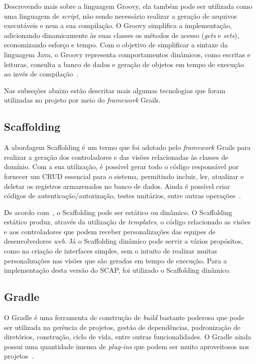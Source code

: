 Descrevendo mais sobre a linguagem Groovy, ela também pode ser utilizada como uma linguagem de \textit{script}, não sendo necessário realizar a geração de arquivos executáveis e nem a sua compilação. O Groovy simplifica a implementação, adicionando dinamicamente às suas classes os métodos de acesso (\textit{gets} e \textit{sets}), economizando esforço e tempo. Com o objetivo de simplificar a sintaxe da linguagem Java, o Groovy representa comportamentos dinâmicos, como escritas e leituras, consulta a banco de dados e geração de objetos em tempo de execução ao invés de compilação~\cite{konig-et-al:gia07}.

Nas subseções abaixo estão descritas mais algumas tecnologias que foram utilizadas no projeto por meio do \textit{framework} Grails.

\subsection{Scaffolding}
\label{sec-projeto-scaffolding}

A abordagem Scaffolding é um termo que foi adotado pelo \textit{framework} Grails para realizar a geração dos controladores e das visões relacionadas às classes de domínio. Com a sua utilização, é possível gerar todo o código responsável por fornecer um CRUD essencial para o sistema, permitindo incluir, ler, atualizar e deletar os registros armazenados no banco de dados. Ainda é possível criar códigos de autenticação/autorização, testes unitários, entre outras operações~\cite{beder:ew12}.

De acordo com~, o Scaffolding pode ser estático ou dinâmico. O Scaffolding estático produz, através da utilização de \textit{templates}, o código relacionado as visões e aos controladores que podem receber personalizações das equipes de desenvolvedores \textit{web}. Já o Scaffolding dinâmico pode servir a vários propósitos, como na criação de interfaces simples, sem o intuito de realizar muitas personalizações nas visões que são geradas em tempo de execução. Para a implementação desta versão do SCAP, foi utilizado o Scaffolding dinâmico.   

\subsection{Gradle}
\label{sec-projeto-gradle}

O Gradle é uma ferramenta de construção de \textit{build} bastante poderosa que pode ser utilizada na gerência de projetos, gestão de dependências, padronização de diretórios, construção, ciclo de vida, entre outras funcionalidades. O Gradle ainda possui uma quantidade imensa de \textit{plug-ins} que podem ser muito aproveitosos nos projetos~\cite{weissmann:fgapdw15}.

